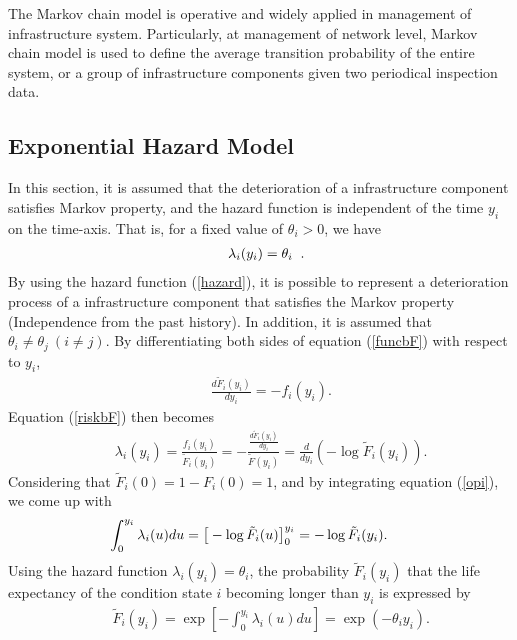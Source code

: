 The Markov chain model is operative and widely applied in management of infrastructure system. Particularly, at management of network level, Markov chain model is used to define the average transition probability of the entire system, or a group of infrastructure components given two periodical inspection data.
\subsection{Exponential Hazard Model}
\label{233}
In this section, it is assumed that the deterioration of a infrastructure component satisfies Markov property, and the hazard function is independent of the time $y_i$ on the time-axis. That is, for a fixed value of $\theta_i>0$, we have
\begin{eqnarray}
&& \lambda_i(y_i)=\theta_i \hspace{2mm}. \label{hazard}
\end{eqnarray}
By using the hazard function (\ref{hazard}), it is possible to represent a deterioration process of a infrastructure component that satisfies the Markov property (Independence from the past history). In addition, it is assumed that $\theta_i\neq \theta_j~(i \neq j)$. By differentiating both sides of equation (\ref{funcbF}) with respect to $y_i$,
\begin{eqnarray}
&& \frac{d\tilde{F}_i(y_i)}{dy_i}=-f_i(y_i).\label{op}
\end{eqnarray}
Equation (\ref{riskbF}) then becomes
\begin{eqnarray}
&& \lambda_i(y_i) = \frac{f_i(y_i)}{\tilde{F}_i(y_i)} =-\frac{\frac{d\tilde{F}_i(y_i)}{dy_i}}{\tilde{F}(y_i)} 
= \frac{d}{dy_i}\left( - \log \tilde{F}_i(y_i) \right).\label{opi}
\end{eqnarray}
Considering that $\tilde{F}_i(0)=1-F_i(0)=1$, and by integrating equation (\ref{opi}), we come up with
\begin{eqnarray}
&& \hspace{-9mm} \int_{0}^{y_i} \lambda_i(u)du = \big[-\log \tilde{F}_i(u)\big]_{0}^{y_i} = -\log \tilde{F}_i(y_i).
\end{eqnarray}
Using the hazard function $\lambda_i(y_i)=\theta_i$, the probability $\tilde{F}_i(y_i)$ that the life expectancy of the condition state $i$ becoming longer than $y_i$ is expressed by
\begin{eqnarray}
&& \tilde{F}_i(y_i) = \exp \left[ - \int_{0}^{y_i}\lambda_i(u)du \right] 
 = \exp (-\theta_i y_i). \label{prop-bFla}
\end{eqnarray}
